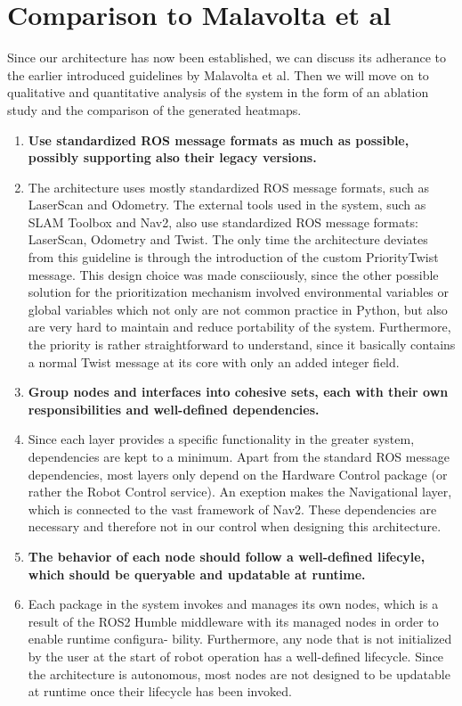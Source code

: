 \documentclass[]{article}
\begin{document}
	\section{Comparison to Malavolta et al}
	Since our architecture has now been established, we can discuss its adherance to the earlier introduced guidelines by Malavolta et al. Then we will move on to qualitative and quantitative analysis of the system in the form of an ablation study and the comparison of the generated heatmaps.
	\begin{enumerate}[leftmargin=9mm, align=left]
		\item \textbf{Use standardized ROS message formats as much as possible, possibly supporting also their legacy versions.} 
		\item[]The architecture uses mostly standardized ROS message formats, such as LaserScan and Odometry. The external tools used in the system, such as SLAM Toolbox and Nav2, also use standardized ROS message formats: LaserScan, Odometry and Twist. The only time the architecture deviates from this guideline is through the introduction of the custom PriorityTwist message. This design choice was made consciiously, since the other possible solution for the prioritization mechanism involved environmental variables or global variables which not only are not common practice in Python, but also are very hard to maintain and reduce portability of the system. Furthermore, the priority is rather straightforward to understand, since it basically contains a normal Twist message at its core with only an added integer field.
		
		\item \textbf{Group nodes and interfaces into cohesive sets, each with their own responsibilities and well-defined dependencies.} 
		\item[]Since each layer provides a specific functionality in the greater system, dependencies are kept to a minimum. Apart from the standard ROS message dependencies, most layers only depend on the Hardware Control package (or rather the Robot Control service). An exeption makes the Navigational layer, which is connected to the vast framework of Nav2. These dependencies are necessary and therefore not in our control when designing this architecture.
		\item \textbf{The behavior of each node should follow a well-defined lifecyle, which should be queryable and updatable at runtime.} 
		\item[]
		Each package in the system invokes and manages its own nodes, which is a result of the ROS2 Humble middleware with its managed nodes in order to enable runtime configura- bility. Furthermore, any node that is not initialized by the user at the start of robot operation has a well-defined lifecycle. Since the architecture is autonomous, most nodes are not designed to be updatable at runtime once their lifecycle has been invoked.
		

\end{enumerate}
\end{document}
